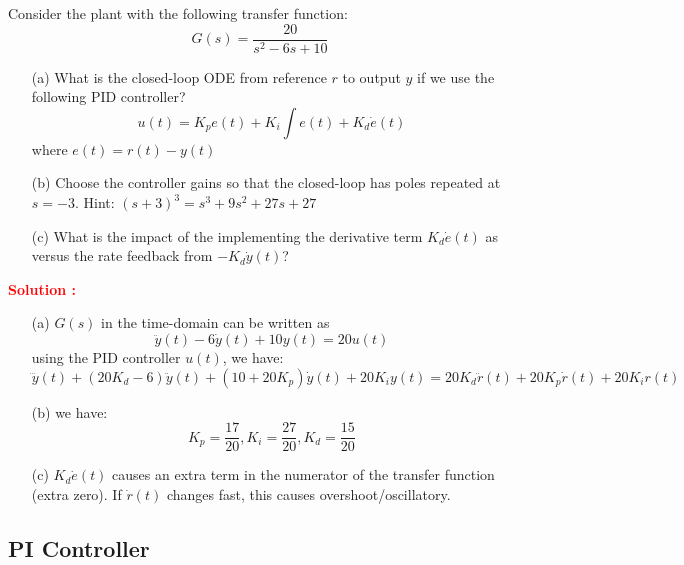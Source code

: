 \documentclass[12pt]{article}
\begin{document}
Consider the plant with the following transfer function:
\begin{equation}
    G(s) = \frac{20}{s^2-6s+10}
\end{equation}
\begin{itemize}
    \item[(a)] What is the closed-loop ODE from reference \(r\) to output \(y\) if we use the following PID controller?
    \[u(t) = K_p e(t) + K_i \int e(t) + K_d \dot{e}(t)\]
    where \(e(t) = r(t) - y(t)\)
    \item[(b)] Choose the controller gains so that the closed-loop has poles repeated at \(s = -3\). Hint: \((s+3)^3 = s^3+9s^2+27s+27\)
    \item[(c)] What is the impact of the implementing the derivative term \(K_d \dot{e}(t)\) as versus the rate feedback from \(-K_d \dot{y}(t)\)?
\end{itemize}
\textbf{\textcolor{red}{Solution :}} 
\begin{itemize}
    \item[(a)] \(G(s)\) in the time-domain can be written as
    \[\ddot{y}(t) - 6\dot{y}(t) + 10 y(t) = 20 u(t)\]
    using the PID controller \(u(t)\), we have:
    \[\dddot{y}(t) + (20 K_d-6)\ddot{y}(t) + (10 + 20 K_p)\dot{y}(t) + 20 K_i y(t) = 20 K_d \ddot{r}(t) + 20 K_p \dot{r}(t) + 20 K_i r(t)\]
    \item[(b)]
    we have:
    \[K_p =\frac{17}{20}, K_i = \frac{27}{20}, K_d = \frac{15}{20}\]
    \item[(c)] \(K_d \dot{e}(t)\) causes an extra term in the numerator of the transfer function (extra zero). If \(\dot{r}(t)\) changes fast, this causes overshoot/oscillatory.
\end{itemize}

\clearpage
\subsection{PI Controller}
\end{document}
